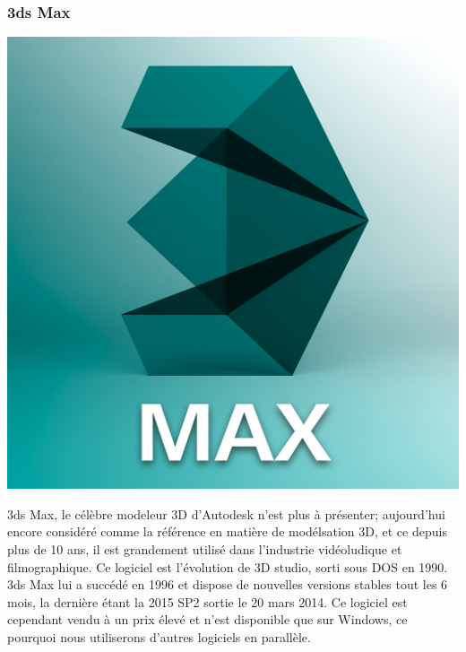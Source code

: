 	\subsubsection{3ds Max}
		\noindent\begin{minipage}{0.3\textwidth}
			\includegraphics[width=\linewidth]{1-PreEtude/img/3dsmax_logo}
			\end{minipage}
			\hfill
			\begin{minipage}{0.65\textwidth}
			3ds Max\cite{3dsmax}, le célèbre modeleur 3D d'Autodesk n'est plus à présenter; aujourd'hui encore considéré comme la référence en matière de modélsation 3D, et ce depuis plus de 10 ans, il est grandement utilisé dans l'industrie vidéoludique et filmographique.
			Ce logiciel est l'évolution de 3D studio, sorti sous DOS en 1990. 3ds Max lui a succédé en 1996 et dispose de nouvelles versions stables tout les 6 mois, la dernière étant la 2015 SP2 sortie le 20 mars 2014.
			Ce logiciel est cependant vendu à un prix élevé et n'est disponible que sur Windows, ce pourquoi nous utiliserons d'autres logiciels en parallèle.
		\end{minipage}


